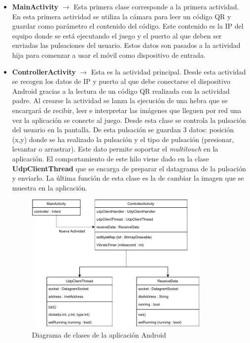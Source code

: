 \begin {itemize}
\item \textbf{MainActivity} $\rightarrow$ Esta primera clase corresponde a la primera actividad. En esta primera actividad se utiliza la c\'amara para leer un c\'odigo QR y guardar como par\'ametro el contenido del c\'odigo. Este contenido es la IP del equipo donde se est\'a ejecutando el juego y el puerto al que deben ser enviadas las pulsaciones del usuario. Estos datos son pasados a la actividad hija para comenzar a usar el m\'ovil como dispositivo de entrada.
\item \textbf{ControllerActivity} $\rightarrow$ Esta es la actividad principal. Desde esta actividad se recogen los datos de IP y puerto al que debe conectarse el dispositivo Android gracias a la lectura de un c\'odigo QR realizada con la actividad padre. Al crearse la actividad se lanza la ejecuci\'on de una hebra que se encargar\'a de recibir, leer e interpretar las im\'agenes que lleguen por red una vez la aplicaci\'on se conecte al juego. Desde esta clase se controla la pulsaci\'on del usuario en la pantalla. De esta pulsaci\'on se guardan 3 datos: posici\'on (x,y) donde se ha realizado la pulsaci\'on y el tipo de pulsaci\'on (presionar, levantar o arrastrar). Este dato permite soportar el \textit{multitouch} en la aplicaci\'on. El comportamiento de este hilo viene dado en la clase \textbf{UdpClientThread} que se encarga de preparar el datagrama de la pulsaci\'on y enviarlo. La \'ultima funci\'on de esta clase es la de cambiar la imagen que se muestra en la aplicaci\'on. 
\begin{figure}[!h]

\centering
\includegraphics[width=0.85\textwidth]{./Imagenes/Vectorial/Arquitectura_App_Android.pdf}
\caption{Diagrama de clases de la aplicaci\'on Android}
\end{figure}


\end{itemize}
